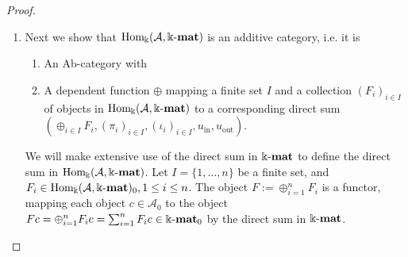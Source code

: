 \begin{proof}
\begin{enumerate}
\begin{subproof}[Proof of (i)]
We identify as the neutral element $0_{F,G} \in \mathrm{Hom}_{\HomAkmat}(F,G)$ (or simply $0$ when the context is clear)
the natural transformation $0$ with each component $0_{c} = 0_{Fc,Gc}$ being the $Fc\times Gc$ zero matrix.
For each natural transformation $\eta$ the additive inverse $-\eta$ is defined component-wise as
\begin{align}
(-\eta)_{c} &:= -\eta_{c}.
\end{align}
We also confirm that the addition is commutative:
\begin{align}
(\eta+\varepsilon)_{c} &= \eta_{c} + \varepsilon_{c}\\
    &= \varepsilon_{c} + \eta_{c}\\
    &= (\varepsilon + \eta)_{c}
\end{align}
This concludes that for each $F, G \in \HomAkmat,\, \mathrm{Hom}_{\HomAkmat}(F,G)$ is an Abelian group.
\end{subproof}
\begin{subproof}[Proof of (ii)]
Let $F, G, H \in \HomAkmat$ and let $\eta, \varepsilon \in \mathrm{Hom}_{\HomAkmat}(F,G)$,
$\varphi, \psi \in \mathrm{Hom}_{\HomAkmat}(G,H)$ and $x \in \Bbbk$.\\
The composition $\eta\varphi \in \mathrm{Hom}_{\HomAkmat}(F,H)$ is defined by component-wise matrix-multiplication,
i.e. $\forall c \in \mathcal{A}$
\begin{align*}
(\eta\varphi)_{c} := \eta_{c}\varphi_{c}
\end{align*}
and from this follows the bilinearity of the composition, since the matrix multiplication is bilinear.\\
This concludes the first part of the proof, i.e. $\HomAkmat$ is an Ab-category.
\end{subproof}

\item Next we show that $\HomAkmat$ is an additive category, i.e. it is
\begin{enumerate}
\renewcommand{\labelenumii}{(\roman{enumii})}
\item An Ab-category with
\item A dependent function $\oplus$ mapping a finite set $I$ and a collection $(F_{i})_{i\in I}$ of objects in $\HomAkmat$
to a corresponding direct sum $( \oplus_{i\in I} F_{i}, (\pi_{i})_{i\in I}, (\iota_{i})_{i\in I}, u_{\mathrm{in}}, u_{\mathrm{out}} )$.
\end{enumerate}
\begin{subproof}[Proof of (ii)]
We will make extensive use of the direct sum in $\Bbbk\textnormal{-}\mathbf{mat}$ to define the direct sum in $\HomAkmat$.
Let $I = \{1,\dots,n\}$ be a finite set, and $F_{i} \in \mathrm{Hom_{\Bbbk}}(\mathcal{A},\Bbbk\textnormal{-}\mathbf{mat})_{0}, 1\leq i\leq n$. The object $F := \oplus_{i=1}^{n} F_{i}$ is a functor, mapping
each object $c \in \mathcal{A}_{0}$ to the object $Fc = \oplus_{i=1}^{n} F_{i}c = \sum_{i=1}^{n} F_{i}c \in \Bbbk\textnormal{-}\mathbf{mat}_{0}$ by the direct sum in $\Bbbk\textnormal{-}\mathbf{mat}$.\\





\end{subproof}
\end{enumerate}
\end{proof}
